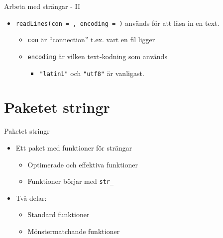 \documentclass[
  10pt,
  ignorenonframetext,
  handout]{beamer}
\providecommand{\tightlist}{%
  \setlength{\itemsep}{0pt}\setlength{\parskip}{0pt}}
\begin{document}
\begin{frame}{Arbeta med strängar - II}
\label{arbeta-med-struxe4ngar---ii}
\begin{itemize}
\tightlist
\item
  \texttt{readLines(con = , encoding = )} används för att läsa in en
  text.

  \begin{itemize}
  \tightlist
  \item
    \texttt{con} är ``connection'' t.ex. vart en fil ligger
  \item
    \texttt{encoding} är vilken text-kodning som används

    \begin{itemize}
    \tightlist
    \item
      \texttt{"latin1"} och \texttt{"utf8"} är vanligast.
    \end{itemize}
  \end{itemize}
\end{itemize}
\end{frame}

\section{Paketet stringr}\label{paketet-stringr}

\begin{frame}{Paketet stringr}
\label{paketet-stringr-1}
\begin{itemize}
\tightlist
\item
  Ett paket med funktioner för strängar

  \begin{itemize}
  \tightlist
  \item
    Optimerade och effektiva funktioner
  \item
    Funktioner börjar med \texttt{str\_}
  \end{itemize}
\item
  Två delar:

  \begin{itemize}
  \tightlist
  \item
    Standard funktioner
  \item
    Mönstermatchande funktioner
  \end{itemize}
\end{itemize}
\end{frame}
\end{document}
